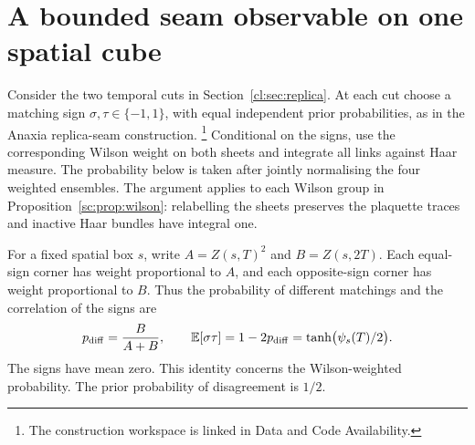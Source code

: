 \section{A bounded seam observable on one spatial cube}\label{cl:sec:bounded-seam}

Consider the two temporal cuts in Section~\ref{cl:sec:replica}. At each cut
choose a matching sign $\sigma,\tau\in\{-1,1\}$, with equal independent
prior probabilities, as in the Anaxia replica-seam construction.%
\footnote{The construction workspace is linked in Data and Code Availability.}
Conditional on the signs, use the corresponding
Wilson weight on both sheets and integrate all links against Haar measure.
The probability below is taken after jointly normalising the four
weighted ensembles. The argument applies to each Wilson group in
Proposition~\ref{sc:prop:wilson}: relabelling the sheets preserves the
plaquette traces and inactive Haar bundles have integral one.

For a fixed spatial box $s$, write $A=Z(s,T)^2$ and $B=Z(s,2T)$.
Each equal-sign corner has weight proportional to $A$, and each
opposite-sign corner has weight proportional to $B$. Thus the probability
of different matchings and the correlation of the signs are
\begin{equation}\label{cl:eq:seam-disagreement}
 p_{\rm diff}=\frac{B}{A+B},\qquad
 \mathbb E[\sigma\tau]=1-2p_{\rm diff}=\tanh\bigl(\psi_s(T)/2\bigr).
\end{equation}
The signs have mean zero. This identity concerns the Wilson-weighted
probability. The prior probability of disagreement is $1/2$.

